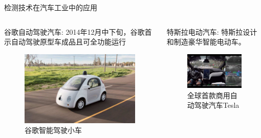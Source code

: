 \documentclass[10pt]{beamer}
\begin{document}
\begin{frame}{检测技术在汽车工业中的应用}

    \begin{columns}
        \begin{column}{0.5\textwidth}
        
        \begin{exampleblock}{谷歌自动驾驶汽车:}
        2014年12月中下旬，谷歌首示自动驾驶原型车成品且可全功能运行

      \end{exampleblock}
             \begin{figure}[htbp] 
            \centering\includegraphics[width=2.25in]{source/intro9.jpg} \caption{谷歌智能驾驶小车}\label{fig:9} 
            \end{figure}
        \end{column}
        \begin{column}{0.5\textwidth}
        \begin{exampleblock}{特斯拉电动汽车:}
       特斯拉设计和制造豪华智能电动车。

      \end{exampleblock}
        \begin{figure}[htbp] 
            \centering\includegraphics[width=2.25in]{source/intro10.png} \caption{全球首款商用自动驾驶汽车Tesla}\label{fig:10} 
            \end{figure}
        
        \end{column}
        \end{columns}
\end{frame}
\end{document}

